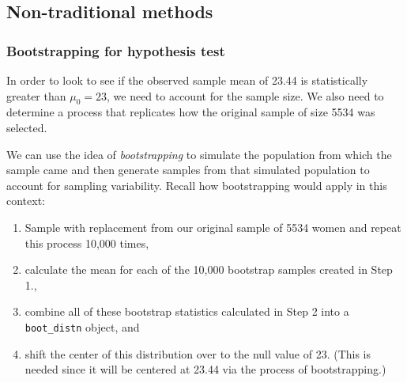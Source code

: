 \documentclass[12pt,]{krantz}
\makeatletter
\newenvironment{Shaded}{\begin{snugshade}}{\end{snugshade}}
\newcommand{\KeywordTok}[1]{\textcolor[rgb]{0.27,0.27,0.27}{\textbf{#1}}}
\newcommand{\DataTypeTok}[1]{\textcolor[rgb]{0.27,0.27,0.27}{#1}}
\newcommand{\DecValTok}[1]{\textcolor[rgb]{0.06,0.06,0.06}{#1}}
\newcommand{\StringTok}[1]{\textcolor[rgb]{0.5,0.5,0.5}{#1}}
\newcommand{\OperatorTok}[1]{\textcolor[rgb]{0.43,0.43,0.43}{\textbf{#1}}}
\newcommand{\NormalTok}[1]{#1}
\providecommand{\tightlist}{%
  \setlength{\itemsep}{0pt}\setlength{\parskip}{0pt}}
\newenvironment{kframe}{%
\medskip{}
\setlength{\fboxsep}{.8em}
 \def\at@end@of@kframe{}%
 \ifinner\ifhmode%
  \def\at@end@of@kframe{\end{minipage}}%
  \begin{minipage}{\columnwidth}%
 \fi\fi%
 \def\FrameCommand##1{\hskip\@totalleftmargin \hskip-\fboxsep
 \colorbox{shadecolor}{##1}\hskip-\fboxsep
     \hskip-\linewidth \hskip-\@totalleftmargin \hskip\columnwidth}%
 \MakeFramed {\advance\hsize-\width
   \@totalleftmargin\z@ \linewidth\hsize
   \@setminipage}}%
 {\par\unskip\endMakeFramed%
 \at@end@of@kframe}
\renewenvironment{Shaded}{\begin{kframe}}{\end{kframe}}
\theoremstyle{definition}
\theoremstyle{definition}
\theoremstyle{definition}
\theoremstyle{remark}
\makeatother
\begin{document}
\subsection{Non-traditional methods}\label{non-traditional-methods}

\subsubsection*{Bootstrapping for hypothesis
test}\label{bootstrapping-for-hypothesis-test}


In order to look to see if the observed sample mean of 23.44 is
statistically greater than \(\mu_0 = 23\), we need to account for the
sample size. We also need to determine a process that replicates how the
original sample of size 5534 was selected.

We can use the idea of \emph{bootstrapping} to simulate the population
from which the sample came and then generate samples from that simulated
population to account for sampling variability. Recall how bootstrapping
would apply in this context:

\begin{enumerate}
\def\labelenumi{\arabic{enumi}.}
\tightlist
\item
  Sample with replacement from our original sample of 5534 women and
  repeat this process 10,000 times,
\item
  calculate the mean for each of the 10,000 bootstrap samples created in
  Step 1.,
\item
  combine all of these bootstrap statistics calculated in Step 2 into a
  \texttt{boot\_distn} object, and
\item
  shift the center of this distribution over to the null value of 23.
  (This is needed since it will be centered at 23.44 via the process of
  bootstrapping.)
\end{enumerate}

\begin{Shaded}
\end{Shaded}
\end{document}
